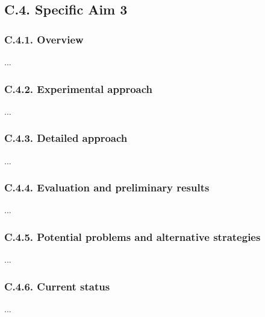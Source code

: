 \subsection{C.4. Specific Aim 3}

\vspace{1cm}
\subsubsection{C.4.1. Overview}

...

\subsubsection{C.4.2. Experimental approach}

...

\subsubsection{C.4.3. Detailed approach}

...

\subsubsection{C.4.4. Evaluation and preliminary results}

...

\subsubsection{C.4.5. Potential problems and alternative strategies}

...

\subsubsection{C.4.6. Current status}

...

